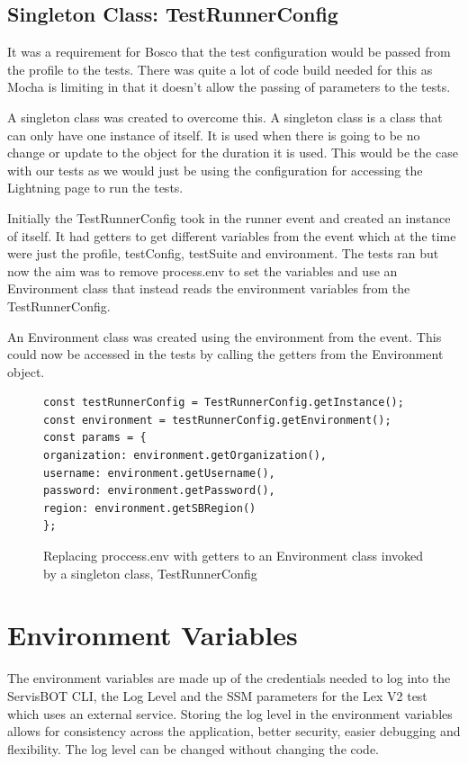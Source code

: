 \documentclass[12pt,a4paper,titlepage]{report}
\begin{document}
\subsection{Singleton Class: TestRunnerConfig}
It was a requirement for Bosco that the test configuration would be passed from the profile to the tests. 
There was quite a lot of code build needed for this as Mocha is limiting in that it doesn't 
allow the passing of parameters to the tests. 

A singleton class was created to overcome this. A singleton class is a class that can only have one instance of 
itself. It is used when there is going to be no change or update to the object for the duration it is used. 
This would be the case with our tests as we would just be using the configuration for accessing the Lightning page to run the tests.

Initially the TestRunnerConfig took in the runner event and created an instance of itself. 
It had getters to get different variables from the event which at the time were just the profile, testConfig, testSuite and environment. 
The tests ran but now the aim was to remove process.env to set the variables and use an Environment class that instead reads the environment variables from the TestRunnerConfig.

An Environment class was created using the environment from the event. This could now be accessed in the tests by calling the getters from the Environment object.
\begin{figure}[H]
 \begin{tcolorbox}
  \begin{verbatim}
const testRunnerConfig = TestRunnerConfig.getInstance();
const environment = testRunnerConfig.getEnvironment();
const params = {
organization: environment.getOrganization(),
username: environment.getUsername(),
password: environment.getPassword(),
region: environment.getSBRegion()
};
\end{verbatim}
 \end{tcolorbox}
 \caption{Replacing proccess.env with getters to an Environment class invoked by a singleton class, TestRunnerConfig}
\end{figure}

\section{Environment Variables}
The environment variables are made up of the credentials needed to log into the ServisBOT CLI, the Log Level and the SSM parameters for the Lex V2 test which uses an external service.  
Storing the log level in the environment variables allows for consistency across the application, better security, easier debugging and flexibility. 
The log level can be changed without changing the code.
\end{document}
